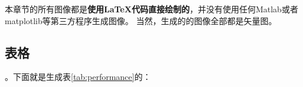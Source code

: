 %

本章节的所有图像都是\textbf{使用\LaTeX 代码直接绘制的}，并没有使用任何Matlab或者matplotlib等第三方程序生成图像。
当然，生成的的图像全部都是矢量图。

\subsection{表格}
。下面就是生成表\ref{tab:performance}的：

